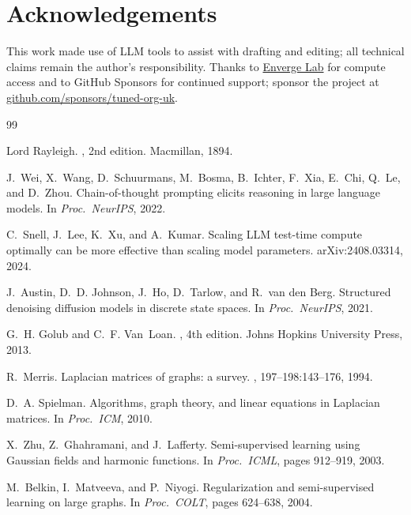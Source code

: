 \documentclass[12pt,a4paper]{article}
\theoremstyle{plain}
\theoremstyle{definition}
\theoremstyle{remark}
\newcommand{\1}{\mathbf{1}}
\begin{document}
\section*{Acknowledgements}
This work made use of LLM tools to assist with drafting and editing; all
technical claims remain the author's responsibility. Thanks to
\href{https://www.enverge.ai/}{Enverge Lab} for compute access and to
GitHub Sponsors for continued support; sponsor the project at
\href{https://github.com/sponsors/tuned-org-uk}{github.com/sponsors/tuned-org-uk}.

\begin{thebibliography}{99}

Lord Rayleigh.
, 2nd edition.
\newblock Macmillan, 1894.

J.~Wei, X.~Wang, D.~Schuurmans, M.~Bosma, B.~Ichter, F.~Xia, E.~Chi,
Q.~Le, and D.~Zhou.
\newblock Chain-of-thought prompting elicits reasoning in large language models.
\newblock In {\em Proc.\ NeurIPS}, 2022.

C.~Snell, J.~Lee, K.~Xu, and A.~Kumar.
\newblock Scaling {LLM} test-time compute optimally can be more effective than
scaling model parameters.
\newblock arXiv:2408.03314, 2024.

J.~Austin, D.~D. Johnson, J.~Ho, D.~Tarlow, and R.~van den Berg.
\newblock Structured denoising diffusion models in discrete state spaces.
\newblock In {\em Proc.\ NeurIPS}, 2021.

G.~H. Golub and C.~F. Van~Loan.
, 4th edition.
\newblock Johns Hopkins University Press, 2013.

R.~Merris.
\newblock Laplacian matrices of graphs: a survey.
, 197--198:143--176, 1994.

D.~A. Spielman.
\newblock Algorithms, graph theory, and linear equations in {L}aplacian matrices.
\newblock In {\em Proc.\ ICM}, 2010.

X.~Zhu, Z.~Ghahramani, and J.~Lafferty.
\newblock Semi-supervised learning using Gaussian fields and harmonic functions.
\newblock In {\em Proc.\ ICML}, pages 912--919, 2003.

M.~Belkin, I.~Matveeva, and P.~Niyogi.
\newblock Regularization and semi-supervised learning on large graphs.
\newblock In {\em Proc.\ COLT}, pages 624--638, 2004.


\end{thebibliography}
\end{document}
